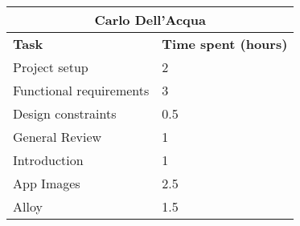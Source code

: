 \begin{table}[h]
  \centering
  \begin{tabular}{l|l}
    \multicolumn{2}{c}{\textbf{Carlo Dell'Acqua}} \\
    \hline
    \textbf{Task} & \textbf{Time spent (hours)}\\
    \hline
    Project setup & 2 \\
    Functional requirements & 3 \\
    Design constraints & 0.5 \\
    General Review & 1 \\
    Introduction & 1 \\
    App Images & 2.5 \\
    Alloy & 1.5 \\
  \end{tabular}
\end{table}